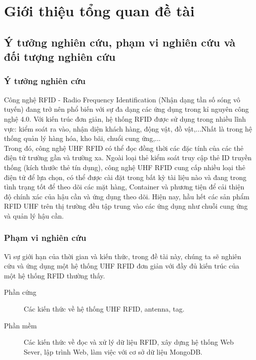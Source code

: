 \headerandfooterconfig

\chapter{Giới thiệu tổng quan đề tài}

\section{Ý tưởng nghiên cứu, phạm vi nghiên cứu và đối tượng nghiên cứu}
\subsection{Ý tưởng nghiên cứu}
Công nghệ RFID - Radio Frequency Identification (Nhận dạng tần số sóng vô tuyến) đang trở nên phổ biến với sự đa dạng các ứng dụng trong kỉ nguyên công nghệ 4.0. Với kiến trúc đơn giản, hệ thống RFID được sử dụng trong nhiều lĩnh vực: kiểm soát ra vào, nhận diện khách hàng, động vật, đồ vật,...Nhất là trong hệ thống quản lý hàng hóa, kho bãi, chuổi cung ứng,...
\label{ref{fig1_2}}
\\Trong đó, công nghệ UHF RFID có thể đọc đồng thời các đặc tính của các thẻ điện tử trường gần và trường xa. Ngoài loại thẻ kiểm soát truy cập thẻ ID truyền thống (kích thước thẻ tín dụng), công nghệ UHF RFID cung cấp nhiều loại thẻ điện tử để lựa chọn, có thể được cài đặt trong bất kỳ tài liệu nào và đang trong tình trạng tốt để theo dõi các mặt hàng, Container và phương tiện để cải thiện độ chính xác của hậu cần và ứng dụng theo dõi. Hiện nay, hầu hết các sản phẩm RFID UHF trên thị trường đều tập trung vào các ứng dụng như chuỗi cung ứng và quản lý hậu cần.

\subsection{Phạm vi nghiên cứu}
Vì sự giới hạn của thời gian và kiến thức, trong đề tài này, chúng ta sẽ nghiên cứu và ứng dụng một hệ thống UHF RFID đơn giản với đầy đủ kiến trúc của một hệ thống RFID thường thấy.

\begin{description}
	\item[Phần cứng] Các kiến thức về hệ thống UHF RFID, antenna, tag.
	\item[Phần mềm] Các kiến thức về đọc và xử lý dữ liệu RFID, xây dựng hệ thống Web Sever, lập trình Web, làm việc với cơ sở dữ liệu MongoDB.
\end{description}

